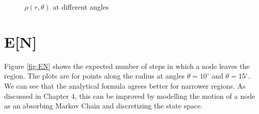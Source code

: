 \begin{figure}[H]
\begin{center}
%
    \end{center}
	\caption[$\rho(r,\theta)$ at different angles]{$\rho(r,\theta)$ at different angles}%
   \label{fig:vangles}
\end{figure}
\section{E[N]}
Figure \ref{fig:EN} shows the expected number of steps in which a node leaves the region.
The plots are for points along the radius at angles $\theta = 10^{\circ}$ and $\theta = 15^{\circ}$. We can see that the analytical formula agrees better for narrower regions. As discussed in Chapter 4, this can be improved by modelling the motion of a node as an absorbing Markov Chain and discretizing the state space.

